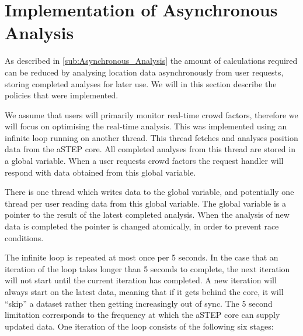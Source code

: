 \section{Implementation of Asynchronous Analysis}
\label{sub:implementation_of_asynchronous_analysis}
As described in \cref{sub:Asynchronous_Analysis} the amount of calculations required can be reduced by analysing location data asynchronously from user requests, storing completed analyses for later use. We will in this section describe the policies that were implemented. 

We assume that users will primarily monitor real-time crowd factors, therefore we will focus on optimising the real-time analysis. This was implemented using an infinite loop running on another thread. This thread fetches and analyses position data from the aSTEP core. All completed analyses from this thread are stored in a global variable. When a user requests crowd factors the request handler will respond with data obtained from this global variable.

There is one thread which writes data to the global variable, and potentially one thread per user reading data from this global variable. The global variable is a pointer to the result of the latest completed analysis. When the analysis of new data is completed the pointer is changed atomically, in order to prevent race conditions.

The infinite loop is repeated at most once per 5 seconds. In the case that an iteration of the loop takes longer than 5 seconds to complete, the next iteration will not start until the current iteration has completed. A new iteration will always start on the latest data, meaning that if it gets behind the core, it will \enquote{skip} a dataset rather then getting increasingly out of sync. The 5 second limitation corresponds to the frequency at which the aSTEP core can supply updated data. One iteration of the loop consists of the following six stages: 

